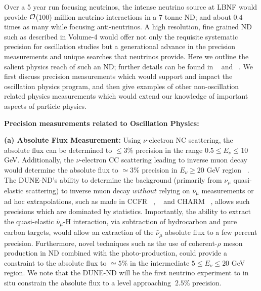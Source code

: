\noindent
Over a 5 year run focusing neutrinos,  the intense neutrino source at LBNF would provide 
${\cal {O}}$(100) million neutrino interactions in a 7 tonne ND; 
and about $0.4$ times as many while focusing anti-neutrinos. 
A high resolution, fine grained ND such as described in Volume-4 would offer not only the requisite systematic 
precision for  oscillation studies but a generational advance in the precision measurements and unique 
searches  that neutrinos provide. Here we outline the salient physics reach of such an ND; further details can be 
found in ~\cite{DPR} and ~\cite{Adams:2013qkq}. We first discuss precision measurements which would support 
and impact the oscillation physics program, and then give examples of other non-oscillation related 
physics measurements which would extend our knowledge of important aspects of particle physics. 


\vspace{0.25cm} 
\noindent 
{\bf Precision measurements related to Oscillation Physics:}

\vspace{0.25cm} 
\noindent 
{\bf (a) Absolute Flux Measurement:} Using  $\nu$-electron NC scattering, the absolute flux can be determined 
to $\leq 3\%$ precision in the range $0.5 \leq E_\nu \leq 10$ GeV. Additionally, the $\nu$-electron CC scattering leading to  inverse 
muon decay would determine the absolute flux to $\simeq 3\%$ precision in $E_\nu \geq 20$ GeV region 
~\cite{ABS-FLUX}. 
The DUNE-ND's ability to determine the background (primarily from $\nu_{\mu}$ quasi-elastic scattering) 
to inverse muon decay  $without$ relying on $\bar \nu_\mu$ measurements or 
ad hoc extrapolations, such as made in CCFR ~\cite{CCFR-IMD-Mishra-89}, ~\cite{CCFR-IMD-Mishra-90} 
and CHARM ~\cite{CHARM-IMD-95}, allows such precisions which are dominated by statistics. 
Importantly, the ability to extract the quasi-elastic 
$\bar \nu_\mu$-H interaction, via subtraction of hydrocarbon and pure carbon targets, would allow an extraction of 
the $\bar \nu_\mu$ absolute flux to a few percent precision. Furthermore, novel techniques such as the use of 
coherent-$\rho$ meson production in ND combined with the photo-production, could provide a constraint 
to the absolute flux to $\simeq 5\%$ in the intermediate $5 \leq E_\nu \leq 20$ GeV region. 
We note that the DUNE-ND will be the first neutrino experiment to in situ constrain the absolute flux 
to a level approaching $~2.5\%$ precision. 

